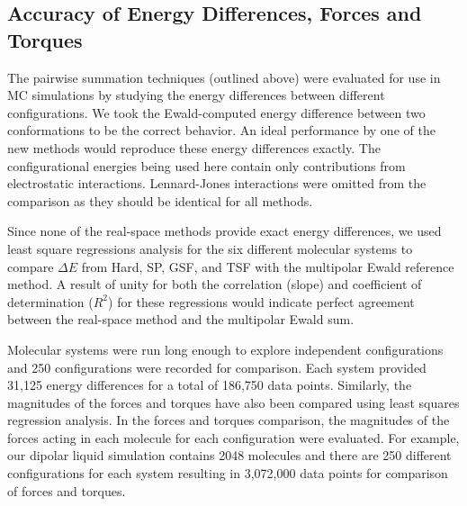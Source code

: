 \subsection{Accuracy of Energy Differences, Forces and Torques}
The pairwise summation techniques (outlined above) were evaluated for
use in MC simulations by studying the energy differences between
different configurations.  We took the Ewald-computed energy
difference between two conformations to be the correct behavior. An
ideal performance by one of the new methods would reproduce these
energy differences exactly. The configurational energies being used
here contain only contributions from electrostatic interactions.
Lennard-Jones interactions were omitted from the comparison as they
should be identical for all methods.

Since none of the real-space methods provide exact energy differences,
we used least square regressions analysis for the six different
molecular systems to compare $\Delta E$ from Hard, SP, GSF, and TSF
with the multipolar Ewald reference method.  A result of unity for
both the correlation (slope) and coefficient of determination ($R^2$)
for these regressions would indicate perfect agreement between the
real-space method and the multipolar Ewald sum.

Molecular systems were run long enough to explore independent
configurations and 250 configurations were recorded for comparison.
Each system provided 31,125 energy differences for a total of 186,750
data points.  Similarly, the magnitudes of the forces and torques have
also been compared using least squares regression analysis. In the
forces and torques comparison, the magnitudes of the forces acting in
each molecule for each configuration were evaluated. For example, our
dipolar liquid simulation contains 2048 molecules and there are 250
different configurations for each system resulting in 3,072,000 data
points for comparison of forces and torques.

